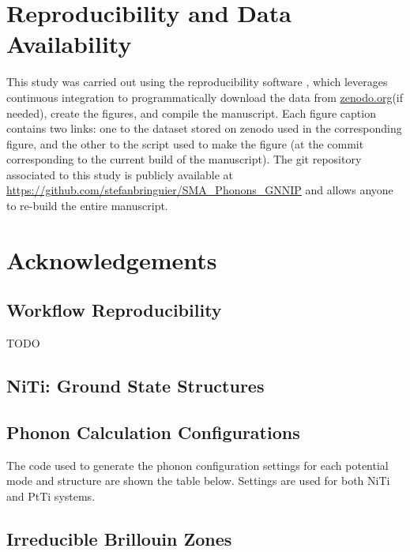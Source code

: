 \documentclass[preprint,colorlinks=true,linkcolor=black,citecolor=black]{elsarticle}
\begin{document}
\section*{Reproducibility and Data Availability}
This study was carried out using the reproducibility software \href{https://github.com/showyourwork/showyourwork}{\showyourwork}\cite{Luger2021}, which leverages continuous integration to programmatically download the data from \href{https://zenodo.org/}{zenodo.org}(if needed), create the figures, and compile the manuscript. Each figure caption contains two links: one to the dataset stored on zenodo used in the corresponding figure, and the other to the script used to make the figure (at the commit corresponding to the current build of the manuscript). The git repository associated to this study is publicly available at \url{https://github.com/stefanbringuier/SMA_Phonons_GNNIP} and allows anyone to re-build the entire manuscript.\par

\section*{Acknowledgements}

\newpage
\appendix

\subsection{Workflow Reproducibility}
\label{sec:appx_reproduce}

TODO

\subsection{NiTi: Ground State Structures}
\label{sec:opt_structures}


\subsection{Phonon Calculation Configurations}
\label{sec:phonon_calc_config}

The code used to generate the phonon configuration settings for each potential mode and structure are shown the table below. Settings are used for both NiTi and PtTi systems.


\subsection{Irreducible Brillouin Zones}
\label{sec:appx_ibz}
\end{document}
